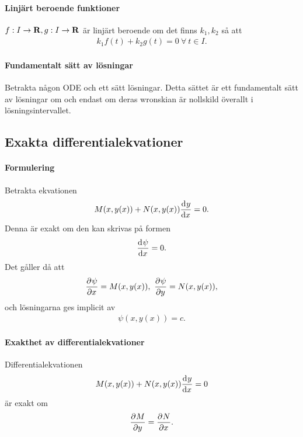 \paragraph{Linjärt beroende funktioner}
$f: I\to\mathbf{R}, g: I\to\mathbf{R}$ är linjärt beroende om det finns $k_{1}, k_{2}$ så att
\begin{align*}
	k_{1}f(t) + k_{2}g(t) = 0\ \forall\ t\in I.
\end{align*}

\paragraph{Fundamentalt sätt av lösningar}
Betrakta någon ODE och ett sätt lösningar. Detta sättet är ett fundamentalt sätt av lösningar om och endast om deras wronskian är nollskild överallt i lösningsintervallet.







\subsection{Exakta differentialekvationer}

\paragraph{Formulering}
Betrakta ekvationen
\begin{align*}
	M(x, y(x)) + N(x, y(x))\dv[]{y}{x} (x) = 0.
\end{align*}
Denna är exakt om den kan skrivas på formen
\begin{align*}
	\dv[]{\psi}{x} (x, y(x)) = 0.
\end{align*}
Det gåller då att
\begin{align*}
	\pdv[]{\psi}{x} (x, y(x)) = M(x, y(x)),\ \pdv[]{\psi}{y} (x, y(x)) = N(x, y(x)),
\end{align*}
och lösningarna ges implicit av
\begin{align*}
	\psi(x, y(x)) = c.
\end{align*}

\paragraph{Exakthet av differentialekvationer}
Differentialekvationen
\begin{align*}
	M(x, y(x)) + N(x, y(x))\dv[]{y}{x} (x) = 0
\end{align*}
är exakt om
\begin{align*}
	\pdv[]{M}{y} (x, y(x)) = \pdv[]{N}{x} (x, y(x)).
\end{align*}

